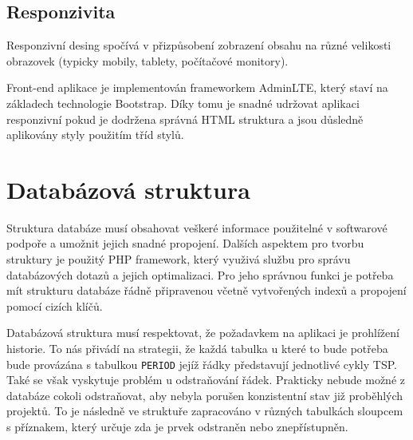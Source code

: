 \documentclass[czech,BP]{thesiskiv}
\begin{document}
		\subsection{Responzivita}
		\par Responzivní desing spočívá v přizpůsobení zobrazení obsahu na různé velikosti obrazovek (typicky mobily, tablety, počítačové monitory).
		\par Front-end aplikace je implementován frameworkem AdminLTE, který staví na základech technologie Bootstrap. Díky tomu je snadné udržovat aplikaci responzivní pokud je dodržena správná HTML struktura a jsou důsledně aplikovány styly použitím tříd stylů.
			
	\section{Databázová struktura}
		\par Struktura databáze musí obsahovat veškeré informace použitelné v softwarové podpoře a umožnit jejich snadné propojení. Dalších aspektem pro tvorbu struktury je použitý PHP framework, který využivá službu pro správu databázových dotazů a jejich optimalizaci. Pro jeho správnou funkci je potřeba mít strukturu databáze řádně připravenou včetně vytvořených indexů a propojení pomocí cizích klíčů.
		\par Databázová struktura musí respektovat, že požadavkem na aplikaci je prohlížení historie. To nás přivádí na strategii, že každá tabulka u které to bude potřeba bude provázána s tabulkou \texttt{PERIOD} jejíž řádky představují jednotlivé cykly TSP. Také se však vyskytuje problém u odstraňování řádek. Prakticky nebude možné z databáze cokoli odstraňovat, aby nebyla porušen konzistentní stav již proběhlých projektů. To je následně ve struktuře zapracováno v různých tabulkách sloupcem s příznakem, který určuje zda je prvek odstraněn nebo znepřístupněn.
		
\end{document}
